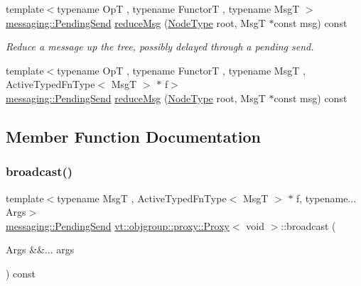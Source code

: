 \begin{DoxyCompactItemize}
\item 
{\footnotesize template$<$typename OpT , typename FunctorT , typename MsgT $>$ }\\\hyperlink{structvt_1_1messaging_1_1_pending_send}{messaging\+::\+Pending\+Send} \hyperlink{structvt_1_1objgroup_1_1proxy_1_1_proxy_3_01void_01_4_a545aeca8f6c0250221796b2138a4583d}{reduce\+Msg} (\hyperlink{namespacevt_a866da9d0efc19c0a1ce79e9e492f47e2}{Node\+Type} root, MsgT $\ast$const msg) const
\begin{DoxyCompactList}\small\item\em Reduce a message up the tree, possibly delayed through a pending send. \end{DoxyCompactList}\item 
{\footnotesize template$<$typename OpT , typename FunctorT , typename MsgT , Active\+Typed\+Fn\+Type$<$ Msg\+T $>$ $\ast$ f$>$ }\\\hyperlink{structvt_1_1messaging_1_1_pending_send}{messaging\+::\+Pending\+Send} \hyperlink{structvt_1_1objgroup_1_1proxy_1_1_proxy_3_01void_01_4_a43d410b08ba8470cf0f060435b4f9ba3}{reduce\+Msg} (\hyperlink{namespacevt_a866da9d0efc19c0a1ce79e9e492f47e2}{Node\+Type} root, MsgT $\ast$const msg) const
\end{DoxyCompactItemize}


\subsection{Member Function Documentation}
\mbox{\label{structvt_1_1objgroup_1_1proxy_1_1_proxy_3_01void_01_4_a13f8d6751a246a449e7d13ae7eed3541}} 
\subsubsection{\texorpdfstring{broadcast()}{broadcast()}\hspace{0.1cm}{\footnotesize\ttfamily [1/2]}}
{\footnotesize\ttfamily template$<$typename MsgT , Active\+Typed\+Fn\+Type$<$ Msg\+T $>$ $\ast$ f, typename... Args$>$ \\
\hyperlink{structvt_1_1messaging_1_1_pending_send}{messaging\+::\+Pending\+Send} \hyperlink{structvt_1_1objgroup_1_1proxy_1_1_proxy}{vt\+::objgroup\+::proxy\+::\+Proxy}$<$ void $>$\+::broadcast (\begin{DoxyParamCaption}\item[{Args \&\&...}]{args }\end{DoxyParamCaption}) const}



